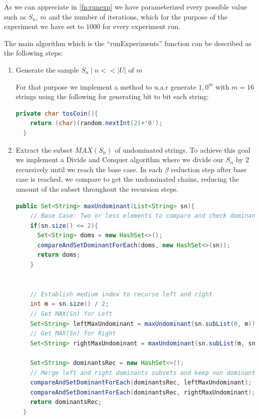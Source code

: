 \documentclass[12pt, a4paper]{article}
\begin{document}
As we can appreciate in \ref{fn:runexp} we have parameterized every possible
value such as $S_n$, $m$ and the number of iterations, which for the purpose of
the experiment we have set to $1000$ for every experiment run.

The main algorithm which is the ``runExperiments'' function can be described as
the following steps:

\begin{enumerate}
 \item Generate the sample $S_n \mid n << |U| \text{ of } m$

For that purpose we implement a method to u.a.r generate ${1,0}^m$ with $m = 16$
strings using the following for generating bit to bit each string:

\begin{lstlisting}[language=Java,caption={tosCoin function},label={fn:toscoin}]
  private char tosCoin(){
    return (char)(random.nextInt(2)+'0');
  }
\end{lstlisting}


\item Extract the subset $MAX(S_n)$ of undominated strings.
  To achieve this goal we implement a Divide and Conquer algorithm where we
  divide our $S_n$ by 2 recursively until we reach the base case. In each $\beta$
  reduction step after base case is reached, we compare to get the undominated
  chains, reducing the amount of the subset throughout the recursion steps.


\begin{lstlisting}[language=Java,caption={maxUndominant function},label={fn:maxUndominant}]
  public Set<String> maxUndominant(List<String> sn){
    // Base Case: Two or less elements to compare and check dominants between them
    if(sn.size() <= 2){
      Set<String> doms = new HashSet<>();
      compareAndSetDominantForEach(doms, new HashSet<>(sn));
      return doms;
    }


    // Establish medium index to recurse left and right
    int m = sn.size() / 2;
    // Get MAX(Sn) for Left
    Set<String> leftMaxUndominant = maxUndominant(sn.subList(0, m));
    // Get MAX(Sn) for Right
    Set<String> rightMaxUndominant = maxUndominant(sn.subList(m, sn.size()));

    Set<String> dominantsRec = new HashSet<>();
    // Merge left and right dominants subsets and keep non dominant between them
    compareAndSetDominantForEach(dominantsRec, leftMaxUndominant);
    compareAndSetDominantForEach(dominantsRec, rightMaxUndominant);
    return dominantsRec;
  }
\end{lstlisting}


\end{enumerate}
\end{document}
